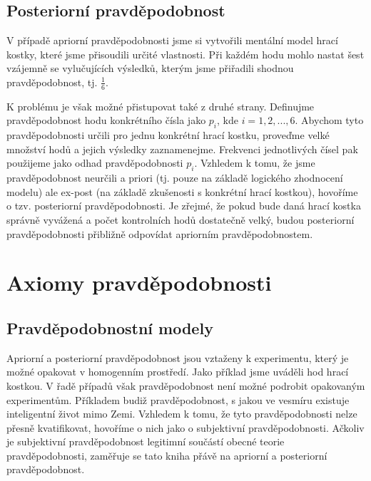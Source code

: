 \subsection{Posteriorní pravděpodobnost}

V případě apriorní pravděpodobnosti jsme si vytvořili mentální model hrací kostky, které jsme přisoudili určité vlastnosti. Při každém hodu mohlo nastat šest vzájemně se vylučujících výsledků, kterým jsme přiřadili shodnou pravděpodobnost, tj. $\frac{1}{6}$.

K problému je však možné přistupovat také z druhé strany. Definujme pravděpodobnost hodu konkrétního čísla jako $p_i$, kde $i = 1, 2,..., 6$. Abychom tyto pravděpodobnosti určili pro jednu konkrétní hrací kostku, proveďme velké množství hodů a jejich výsledky zaznamenejme. Frekvenci jednotlivých čísel pak použijeme jako odhad pravděpodobnosti $p_i$. Vzhledem k tomu, že jsme pravděpodobnost neurčili a priori (tj. pouze na základě logického zhodnocení modelu) ale ex-post (na základě zkušenosti s konkrétní hrací kostkou), hovoříme o tzv. posteriorní pravděpodobnosti. Je zřejmé, že pokud bude daná hrací kostka správně vyvážená a počet kontrolních hodů dostatečně velký, budou posteriorní pravděpodobnosti přibližně odpovídat apriorním pravděpodobnostem.

\section{Axiomy pravděpodobnosti}

\subsection{Pravděpodobnostní modely}

Apriorní a posteriorní pravděpodobnost jsou vztaženy k experimentu, který je možné opakovat v homogenním prostředí. Jako příklad jsme uváděli hod hrací kostkou. V řadě případů však pravděpodobnost není možné podrobit opakovaným experimentům. Příkladem budiž pravděpodobnost, s jakou ve vesmíru existuje inteligentní život mimo Zemi. Vzhledem k tomu, že tyto pravděpodobnosti nelze přesně kvatifikovat, hovoříme o nich jako o subjektivní pravděpodobnosti. Ačkoliv je subjektivní pravděpodobnost legitimní součástí obecné teorie pravděpodobnosti, zaměřuje se tato kniha přávě na apriorní a posteriorní pravděpodobnost.

